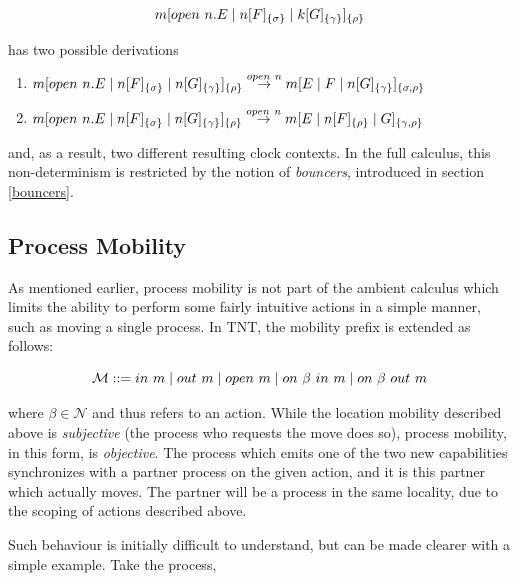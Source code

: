 \begin{equation}
{m}[ open\ n.E\;|\;{n}[ F ]_{\{\sigma\}}\;|\;{k}[ G ]_{\{\gamma\}} ]_{\{\rho\}}
\end{equation}

\noindent has two possible derivations

\begin{enumerate}
\item
      ${m}[ open\ n.E\;|\;{n}[ F ]_{\{\sigma\}}\;|\;{n}[ G ]_{\{\gamma\}} ]_{\{\rho\}}
      \stackrel{open\ n}{\rightarrow} {m}[ E \;|\; F \;|\;
      {n}[ G ]_{\{\gamma\}} ]_{\{\sigma , \rho\}}$
\item
      ${m}[ open\ n.E\;|\;{n}[ F ]_{\{\sigma\}}\;|\;{n}[ G ]_{\{\gamma\}} ]_{\{\rho\}}
      \stackrel{open\ n}{\rightarrow} {m}[ E \;|\; {n}[ F ]_{\{\rho\}} \;|\; G ]_{\{\gamma , \rho\}}$
\end{enumerate}

\noindent and, as a result, two different resulting clock contexts.  In
the full calculus, this non-determinism is restricted by the notion of
\emph{bouncers}, introduced in section \ref{bouncers}.  

\subsection{Process Mobility}
\label{procmob}

As mentioned earlier, process mobility is not part of the ambient
calculus which limits the ability to perform some fairly intuitive
actions in a simple manner, such as moving a single process.  In TNT,
the mobility prefix is extended as follows:

\begin{equation}
    \text{$\mathcal{M}$} ::= in\ m \;|\; out\ m \;|\; open\ m \;|\;
     on\ \beta\ in\ m \;|\; on\ \beta\ out\ m
\end{equation}

\noindent where $\beta \in \mathcal{N}$ and thus refers to an action.
While the location mobility described above is \emph{subjective} (the
process who requests the move does so), process mobility, in this form,
is \emph{objective}.  The process which emits one of the two new
capabilities synchronizes with a partner process on the given action,
and it is this partner which actually moves.  The partner will be a
process in the same locality, due to the scoping of actions described
above.

Such behaviour is initially difficult to understand, but can be made
clearer with a simple example.  Take the process,

